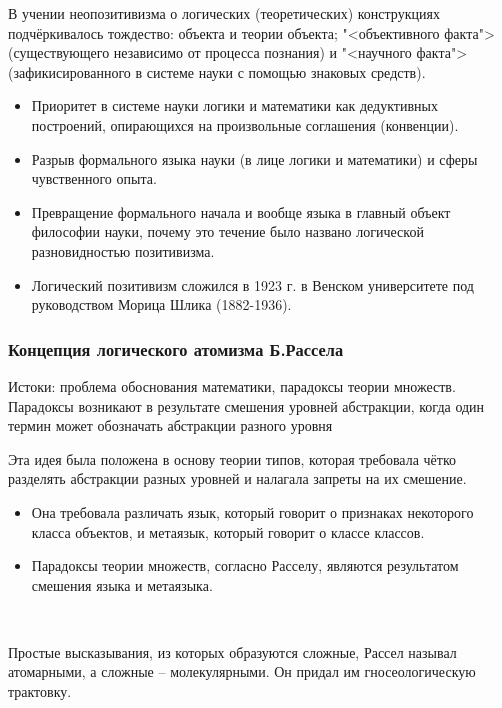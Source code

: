 \documentclass[main.tex]{subfiles}
\begin{document}
{\parindent0pt
В учении неопозитивизма о логических (теоретических) конструкциях подчёркивалось тождество: объекта и теории объекта; "<объективного факта"> (существующего независимо от процесса познания) и "<научного факта"> (зафикисированного в системе науки с помощью знаковых средств).
\begin{itemize}[nosep,leftmargin=0.5cm]
\item Приоритет в системе науки логики и математики как дедуктивных построений, опирающихся на произвольные соглашения (конвенции).
\item Разрыв формального языка науки (в лице логики и математики) и сферы чувственного опыта.
\item Превращение формального начала и вообще языка в главный объект философии науки, почему это течение было названо логической разновидностью позитивизма.
\item Логический позитивизм сложился в 1923 г. в Венском университете под руководством Морица Шлика (1882-1936).
\end{itemize}
}
 


\subsubsection{Концепция логического атомизма Б.Рассела}

{\parindent0pt
Истоки: проблема обоснования математики, парадоксы теории множеств.
}
\ \\

{\parindent0pt
Парадоксы возникают в результате смешения уровней абстракции, когда один термин может обозначать абстракции разного уровня
}
\ \\

{\parindent0pt
Эта идея была положена в основу теории типов, которая требовала чётко разделять абстракции разных уровней и налагала запреты на их смешение.
\begin{itemize}[nosep,leftmargin=0.5cm]
\item Она требовала различать язык, который говорит о признаках некоторого класса объектов, и метаязык, который говорит о классе классов.
\item Парадоксы теории множеств, согласно Расселу, являются результатом смешения языка и метаязыка.
\end{itemize}
}
\ 

{\parindent0pt
Простые высказывания, из которых образуются сложные, Рассел называл атомарными, а сложные -- молекулярными.
Он придал им гносеологическую трактовку.

}
\ 
\end{document}
